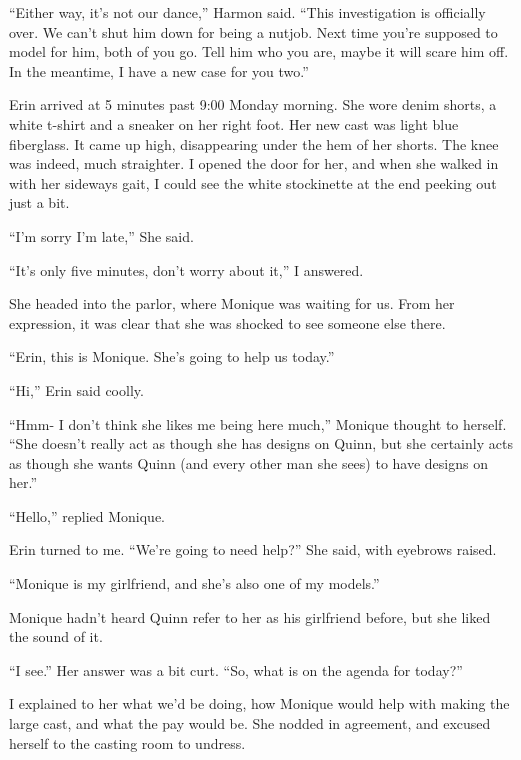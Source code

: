 ``Either way, it's not our dance,'' Harmon said. ``This investigation is officially over. We
can't shut him down for being a nutjob. Next time you're supposed to model for him, both of you
go. Tell him who you are, maybe it will scare him off. In the meantime, I have a new case for
you two.''

Erin arrived at 5 minutes past 9:00 Monday morning. She wore denim shorts, a white t-shirt
and a sneaker on her right foot. Her new cast was light blue fiberglass. It came up high,
disappearing under the hem of her shorts. The knee was indeed, much straighter. I opened the
door for her, and when she walked in with her sideways gait, I could see the white stockinette
at the end peeking out just a bit.

``I'm sorry I'm late,'' She said.

``It's only five minutes, don't worry about it,'' I answered.

She headed into the parlor, where Monique was waiting for us. From her expression, it was
clear that she was shocked to see someone else there.

``Erin, this is Monique. She's going to help us today.''

``Hi,'' Erin said coolly.

\begin{thought}
``Hmm- I don't think she likes me being here much,'' Monique thought to herself. ``She doesn't
really act as though she has designs on Quinn, but she certainly acts as though she wants Quinn
(and every other man she sees) to have designs on her.''
\end{thought}

``Hello,'' replied Monique.

Erin turned to me. ``We're going to need help?'' She said, with eyebrows raised.

``Monique is my girlfriend, and she's also one of my models.''

\begin{thought}
Monique hadn't heard Quinn refer to her as his girlfriend before, but she liked the sound
of it.
\end{thought}

``I see.'' Her answer was a bit curt. ``So, what is on the agenda for today?''

I explained to her what we'd be doing, how Monique would help with making the large cast,
and what the pay would be. She nodded in agreement, and excused herself to the casting room to
undress.

